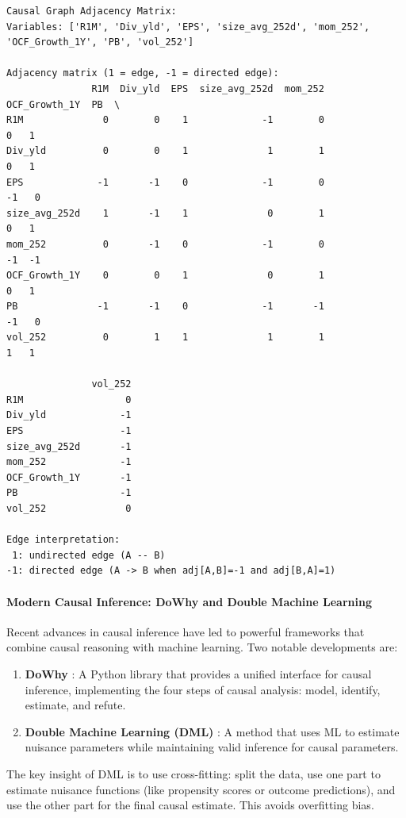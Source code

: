 \begin{verbatim}
Causal Graph Adjacency Matrix:
Variables: ['R1M', 'Div_yld', 'EPS', 'size_avg_252d', 'mom_252', 'OCF_Growth_1Y', 'PB', 'vol_252']

Adjacency matrix (1 = edge, -1 = directed edge):
               R1M  Div_yld  EPS  size_avg_252d  mom_252  OCF_Growth_1Y  PB  \
R1M              0        0    1             -1        0              0   1   
Div_yld          0        0    1              1        1              0   1   
EPS             -1       -1    0             -1        0             -1   0   
size_avg_252d    1       -1    1              0        1              0   1   
mom_252          0       -1    0             -1        0             -1  -1   
OCF_Growth_1Y    0        0    1              0        1              0   1   
PB              -1       -1    0             -1       -1             -1   0   
vol_252          0        1    1              1        1              1   1   

               vol_252  
R1M                  0  
Div_yld             -1  
EPS                 -1  
size_avg_252d       -1  
mom_252             -1  
OCF_Growth_1Y       -1  
PB                  -1  
vol_252              0  

Edge interpretation:
 1: undirected edge (A -- B)
-1: directed edge (A -> B when adj[A,B]=-1 and adj[B,A]=1)
\end{verbatim}

\paragraph{Modern Causal Inference: DoWhy and Double Machine Learning}

Recent advances in causal inference have led to powerful frameworks that combine causal reasoning with machine learning. Two notable developments are:

\begin{enumerate}
\item \textbf{DoWhy} \citep{sharma2020dowhy}: A Python library that provides a unified interface for causal inference, implementing the four steps of causal analysis: model, identify, estimate, and refute.
\item \textbf{Double Machine Learning (DML)} \citep{chernozhukov2018double}: A method that uses ML to estimate nuisance parameters while maintaining valid inference for causal parameters.
\end{enumerate}

The key insight of DML is to use cross-fitting: split the data, use one part to estimate nuisance functions (like propensity scores or outcome predictions), and use the other part for the final causal estimate. This avoids overfitting bias.

